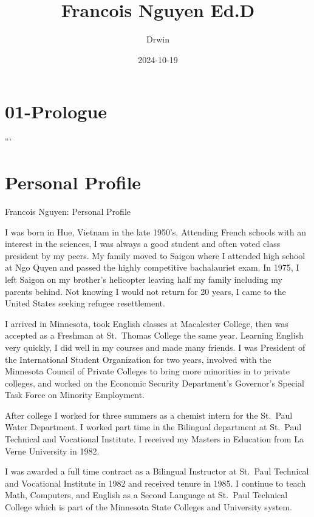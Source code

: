 \documentclass[
]{book}
\title{Francois Nguyen Ed.D}
\author{Drwin}
\date{2024-10-19}
\begin{document}
\maketitle

{
\setcounter{tocdepth}{1}
\tableofcontents
}
\chapter{01-Prologue}\label{prologue}

```

\chapter{Personal Profile}\label{profile}

Francois Nguyen: Personal Profile

I was born in Hue, Vietnam in the late 1950's. Attending French schools with an interest in the sciences, I was always a good student and often voted class president by my peers. My family moved to Saigon where I attended high school at Ngo Quyen and passed the highly competitive bachalauriet exam. In 1975, I left Saigon on my brother's helicopter leaving half my family including my parents behind. Not knowing I would not return for 20 years, I came to the United States seeking refugee resettlement.

I arrived in Minnesota, took English classes at Macalester College, then was accepted as a Freshman at St.~Thomas College the same year. Learning English very quickly, I did well in my courses and made many friends. I was President of the International Student Organization for two years, involved with the Minnesota Council of Private Colleges to bring more minorities in to private colleges, and worked on the Economic Security Department's Governor's Special Task Force on Minority Employment.

After college I worked for three summers as a chemist intern for the St.~Paul Water Department. I worked part time in the Bilingual department at St.~Paul Technical and Vocational Institute. I received my Masters in Education from La Verne University in 1982.

I was awarded a full time contract as a Bilingual Instructor at St.~Paul Technical and Vocational Institute in 1982 and received tenure in 1985. I continue to teach Math, Computers, and English as a Second Language at St.~Paul Technical College which is part of the Minnesota State Colleges and University system.
\end{document}
